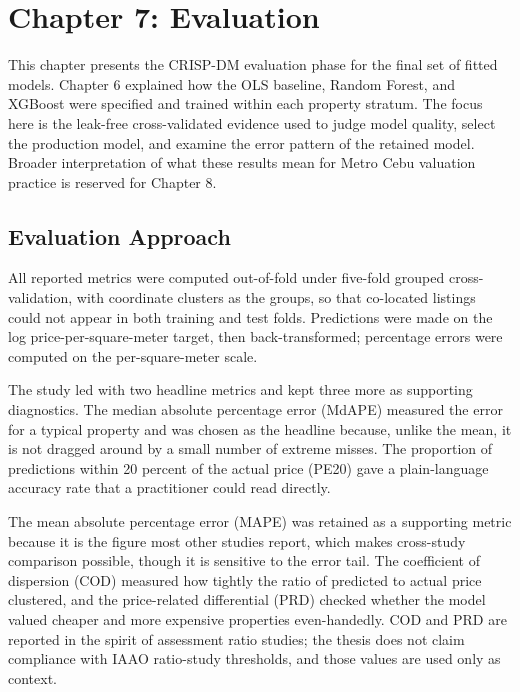 \section{Chapter 7: Evaluation}\label{evaluation}

This chapter presents the CRISP-DM evaluation phase for the final set of fitted models. Chapter 6 explained how the OLS baseline, Random Forest, and XGBoost were specified and trained within each property stratum. The focus here is the leak-free cross-validated evidence used to judge model quality, select the production model, and examine the error pattern of the retained model. Broader interpretation of what these results mean for Metro Cebu valuation practice is reserved for Chapter 8.

\subsection{Evaluation Approach}\label{evaluation-approach}

All reported metrics were computed out-of-fold under five-fold grouped cross-validation, with coordinate clusters as the groups, so that co-located listings could not appear in both training and test folds. Predictions were made on the log price-per-square-meter target, then back-transformed; percentage errors were computed on the per-square-meter scale.

The study led with two headline metrics and kept three more as supporting diagnostics. The median absolute percentage error (MdAPE) measured the error for a typical property and was chosen as the headline because, unlike the mean, it is not dragged around by a small number of extreme misses. The proportion of predictions within 20 percent of the actual price (PE20) gave a plain-language accuracy rate that a practitioner could read directly.

The mean absolute percentage error (MAPE) was retained as a supporting metric because it is the figure most other studies report, which makes cross-study comparison possible, though it is sensitive to the error tail. The coefficient of dispersion (COD) measured how tightly the ratio of predicted to actual price clustered, and the price-related differential (PRD) checked whether the model valued cheaper and more expensive properties even-handedly. COD and PRD are reported in the spirit of assessment ratio studies; the thesis does not claim compliance with IAAO ratio-study thresholds, and those values are used only as context.


